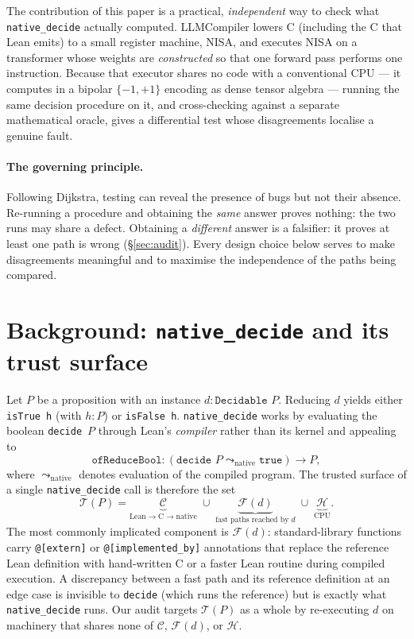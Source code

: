 \documentclass[11pt]{article}
\theoremstyle{definition}
\theoremstyle{plain}
\theoremstyle{remark}
\newcommand{\bp}{\{-1,+1\}}
\begin{document}
The contribution of this paper is a practical, \emph{independent} way to check what
\texttt{native\_decide} actually computed. LLMCompiler lowers C (including the C that Lean emits) to a
small register machine, NISA, and executes NISA on a transformer whose weights are \emph{constructed}
so that one forward pass performs one instruction. Because that executor shares no code with a
conventional CPU --- it computes in a bipolar $\bp$ encoding as dense tensor algebra --- running the
same decision procedure on it, and cross-checking against a separate mathematical oracle, gives a
differential test whose disagreements localise a genuine fault.

\paragraph{The governing principle.} Following Dijkstra, testing can reveal the presence of bugs but
not their absence. Re-running a procedure and obtaining the \emph{same} answer proves nothing: the two
runs may share a defect. Obtaining a \emph{different} answer is a falsifier: it proves at least one
path is wrong (\S\ref{sec:audit}). Every design choice below serves to make disagreements meaningful
and to maximise the independence of the paths being compared.

\section{Background: \texttt{native\_decide} and its trust surface}\label{sec:background}

Let $P$ be a proposition with an instance $d : \texttt{Decidable } P$. Reducing $d$ yields either
\texttt{isTrue h} (with $h : P$) or \texttt{isFalse h}. \texttt{native\_decide} works by evaluating
the boolean \texttt{decide}~$P$ through Lean's \emph{compiler} rather than its kernel and appealing to
\[
  \texttt{ofReduceBool} : (\texttt{decide } P \leadsto_{\text{native}} \texttt{true}) \to P,
\]
where $\leadsto_{\text{native}}$ denotes evaluation of the compiled program. The trusted surface of a
single \texttt{native\_decide} call is therefore the set
\[
  \mathcal{T}(P) = \underbrace{\mathcal{C}}_{\text{Lean}\to\text{C}\to\text{native}}
                 \;\cup\; \underbrace{\mathcal{F}(d)}_{\text{fast paths reached by }d}
                 \;\cup\; \underbrace{\mathcal{H}}_{\text{CPU}} .
\]
The most commonly implicated component is $\mathcal{F}(d)$: standard-library functions carry
\texttt{@[extern]} or \texttt{@[implemented\_by]} annotations that replace the reference Lean
definition with hand-written C or a faster Lean routine during compiled execution. A discrepancy
between a fast path and its reference definition at an edge case is invisible to \texttt{decide} (which
runs the reference) but is exactly what \texttt{native\_decide} runs. Our audit targets $\mathcal{T}(P)$
as a whole by re-executing $d$ on machinery that shares none of $\mathcal{C}$, $\mathcal{F}(d)$, or
$\mathcal{H}$.
\end{document}
